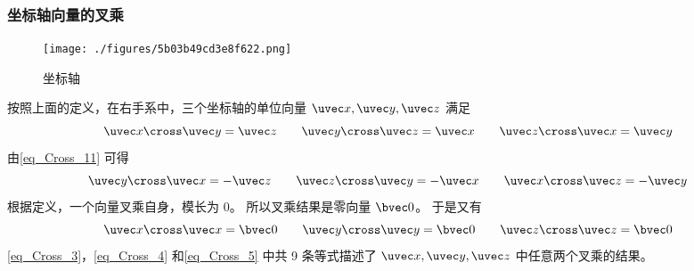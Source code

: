 \subsubsection{坐标轴向量的叉乘}
\begin{figure}[ht]
\centering
\texttt{[image: ./figures/5b03b49cd3e8f622.png]}
\caption{坐标轴} \label{fig_Cross_3}
\end{figure}
按照上面的定义，在右手系中，三个坐标轴的单位向量 $\uvec x, \uvec y, \uvec z$ 满足
\begin{equation}\label{eq_Cross_3}
\uvec x \cross \uvec y = \uvec z
\qquad
\uvec y \cross \uvec z = \uvec x
\qquad
\uvec z \cross \uvec x = \uvec y~
\end{equation}
由\autoref{eq_Cross_11} 可得
\begin{equation}\label{eq_Cross_4}
\uvec y \cross \uvec x =  - \uvec z
\qquad
\uvec z \cross \uvec y =  - \uvec x
\qquad
\uvec x \cross \uvec z =  - \uvec y~
\end{equation}
根据定义，一个向量叉乘自身，模长为 $0$。 所以叉乘结果是零向量 $\bvec 0$。 于是又有
\begin{equation}\label{eq_Cross_5}
\uvec x \cross \uvec x = \bvec 0
\qquad
\uvec y \cross \uvec y = \bvec 0
\qquad
\uvec z \cross \uvec z = \bvec 0~
\end{equation}
\autoref{eq_Cross_3}，\autoref{eq_Cross_4} 和\autoref{eq_Cross_5} 中共 9 条等式描述了 $\uvec x, \uvec y, \uvec z$ 中任意两个叉乘的结果。

